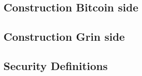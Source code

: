 \subsection{Construction Bitcoin side}\label{secAtomicBtc}
\subsection{Construction Grin side}\label{secAtomicGrn}
\subsection{Security Definitions}\label{secAtomicSec}